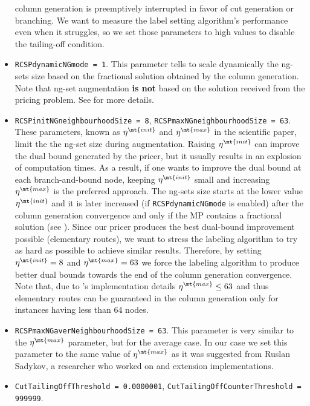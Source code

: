 \begin{itemize}
	      column generation is preemptively interrupted in favor of cut generation or branching.
	      We want to measure the label setting algorithm's performance even when it struggles,
	      so we set those parameters to high values to disable the tailing-off condition.
	\item \texttt{RCSPdynamicNGmode = 1}.
	      This parameter tells \bapcod{} to scale dynamically
	      the ng-sets size based on the
	      fractional solution obtained by the column generation.
	      Note that ng-set augmentation \textbf{is not} based on the solution received from the pricing problem.
	      See \textcite{pessoa2020generic} for more details.
	\item \texttt{RCSPinitNGneighbourhoodSize = 8}, \texttt{RCSPmaxNGneighbourhoodSize = 63}.
	      These parameters, known as $\eta^\mt{init}$ and $\eta^\mt{max}$ in the scientific paper,
	      limit the the ng-set size during augmentation.
	      Raising $\eta^\mt{init}$ can improve the dual bound generated by the pricer,
	      but it usually results in an explosion of computation times.
	      As a result, if one wants to improve the dual bound at each branch-and-bound node,
	      keeping $\eta^\mt{init}$ small and increasing $\eta^\mt{max}$ is the preferred approach.
	      The ng-sets size starts at the lower value $\eta^\mt{init}$ and it is later increased (if \texttt{RCSPdynamicNGmode} is enabled)
	      after the column generation convergence and only if the MP contains a fractional solution (see \cite{pessoa2020generic}).
	      Since our pricer produces the best dual-bound improvement possible (elementary routes),
	      we want to stress the labeling algorithm to try as hard as possible to achieve similar results.
	      Therefore, by setting $\eta^\mt{init} = 8$ and $\eta^\mt{max} = 63$
	      we force the labeling algorithm to produce better dual bounds towards the end of the column generation convergence.
	      Note that, due to \bapcod{}'s implementation details $\eta^\mt{max} \le 63$ and thus
	      elementary routes can be guaranteed in the column generation
	      only for instances having less than $64$ nodes.
	\item \texttt{RCSPmaxNGaverNeighbourhoodSize = 63}.
	      This parameter is very similar to the $\eta^\mt{max}$ parameter, but for the average case.
	      In our case we set this parameter to the same value of $\eta^\mt{max}$
	      as it was suggested from Ruslan Sadykov,
	      a researcher who worked on \bapcod{} and \vrpsolver{} extension implementations.
	\item \texttt{CutTailingOffThreshold = 0.0000001}, \texttt{CutTailingOffCounterThreshold = 999999}.

\end{itemize}
